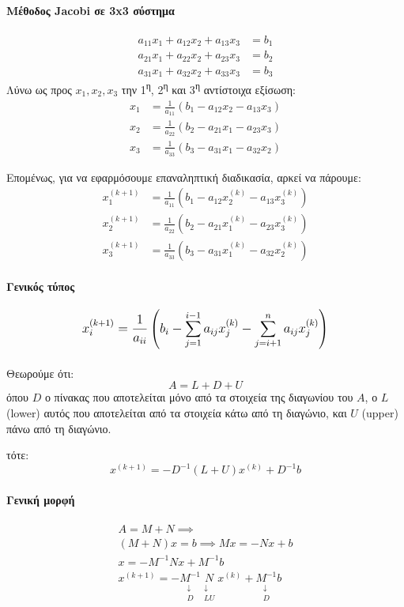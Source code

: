 \documentclass[11pt,a4paper,notitlepage,fleqn]{article}
\begin{document}
\paragraph{Μέθοδος Jacobi σε 3x3 σύστημα}
\begin{align*}
	a_{11}x_1+a_{12}x_2+a_{13}x_3 &= b_1 \\
	a_{21}x_1+a_{22}x_2+a_{23}x_3 &= b_2 \\
	a_{31}x_1+a_{32}x_2+a_{33}x_3 &= b_3
\end{align*}
Λύνω ως προς \( x_1,x_2,x_3 \) την 1\textsuperscript{η},
2\textsuperscript{η} και 3\textsuperscript{η} αντίστοιχα
εξίσωση:
\begin{align*}
	x_1&=\frac{1}{a_{11}}\left(b_1
	- a_{12}x_2-a_{13}x_3\right) \\
	x_2 &= \frac{1}{a_{22}}\left(b_2
	-a_{21}x_1-a_{23}x_3\right) \\
	x_3 &= \frac{1}{a_{33}}\left(b_3
	-a_{31}x_1-a_{32}x_2\right)
\end{align*}

Επομένως, για να εφαρμόσουμε επαναληπτική διαδικασία, αρκεί να
πάρουμε:
\begin{align*}
x_1^{(k+1)}&=\frac{1}{a_{11}}\left(b_1
- a_{12}x_2^{(k)}-a_{13}x_3^{(k)}\right) \\
x_2^{(k+1)} &= \frac{1}{a_{22}}\left(b_2
-a_{21}x_1^{(k)}-a_{23}x_3^{(k)}\right) \\
x_3^{(k+1)} &= \frac{1}{a_{33}}\left(b_3
-a_{31}x_1^{(k)}-a_{32}x_2^{(k)}\right)
\end{align*}

\paragraph{Γενικός τύπος}
\[
\mathlarger{
x_i^{(k+1)} = \frac{1}{a_{ii}}\left(b_i
- \sum_{j=1}^{i-1} a_{ij}x_j^{(k)}
- \sum_{j=i+1}^{n} a_{ij}x_j^{(k)}
\right)
}
\]

\paragraph{}
Θεωρούμε ότι:
\[
A = L + D + U
\]
όπου \( D \) ο πίνακας που αποτελείται μόνο από τα στοιχεία
της διαγωνίου του \( A \), ο \( L \) (lower) αυτός που αποτελείται
από τα στοιχεία κάτω από τη διαγώνιο, και \( U \) (upper) πάνω
από τη διαγώνιο.

τότε:
\[
x^{(k+1)} = -D^{-1}(L+U)x^{(k)} + D^{-1}b
\]

\paragraph{Γενική μορφή}
\begin{gather*}
	A = M +N \implies \\
	(M+N)x = b \implies Mx = -Nx + b\\
	\boxed{x = -M^{-1}Nx + M^{-1}b } \\
	x^{(k+1)} = -\underset{\substack{\downarrow\\D}}{M^{-1}}
	\underset{\substack{\downarrow\\LU}}{N} x^{(k)}
	+ \underset{\substack{\downarrow\\D}}{M^{-1}} b
\end{gather*}
\end{document}
